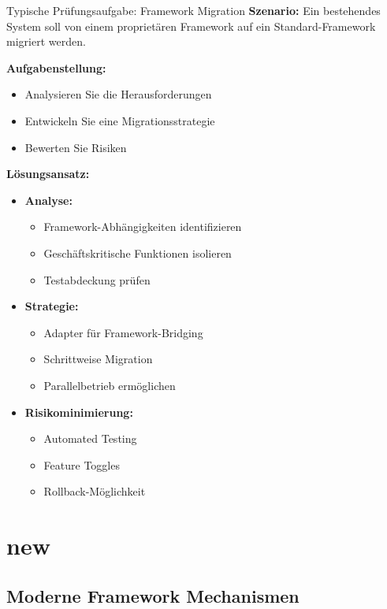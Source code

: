 \begin{example2}{Typische Prüfungsaufgabe: Framework Migration}
\textbf{Szenario:}
Ein bestehendes System soll von einem proprietären Framework auf ein Standard-Framework 
migriert werden.

\textbf{Aufgabenstellung:}
\begin{itemize}
    \item Analysieren Sie die Herausforderungen
    \item Entwickeln Sie eine Migrationsstrategie
    \item Bewerten Sie Risiken
\end{itemize}

\textbf{Lösungsansatz:}
\begin{itemize}
    \item \textbf{Analyse:}
    \begin{itemize}
        \item Framework-Abhängigkeiten identifizieren
        \item Geschäftskritische Funktionen isolieren
        \item Testabdeckung prüfen
    \end{itemize}
    
    \item \textbf{Strategie:}
    \begin{itemize}
        \item Adapter für Framework-Bridging
        \item Schrittweise Migration
        \item Parallelbetrieb ermöglichen
    \end{itemize}
    
    \item \textbf{Risikominimierung:}
    \begin{itemize}
        \item Automated Testing
        \item Feature Toggles
        \item Rollback-Möglichkeit
    \end{itemize}
\end{itemize}
\end{example2}

\pagebreak

\section{new}

\subsection{Moderne Framework Mechanismen}

